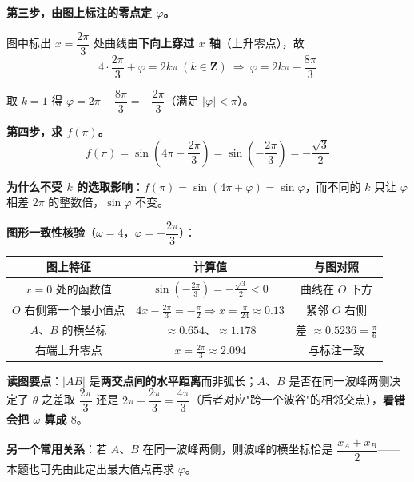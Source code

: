 \textbf{第三步，由图上标注的零点定 $\varphi$。}

图中标出 $x=\dfrac{2\pi}3$ 处曲线\textbf{由下向上穿过 $x$ 轴}（上升零点），故
\[4\cdot\frac{2\pi}3+\varphi=2k\pi\ (k\in\mathbf Z)\ \Longrightarrow\ \varphi=2k\pi-\frac{8\pi}3\]

取 $k=1$ 得 $\varphi=2\pi-\dfrac{8\pi}3=-\dfrac{2\pi}3$（满足 $|\varphi|<\pi$）。

\textbf{第四步，求 $f(\pi)$。}
\[f(\pi)=\sin\left(4\pi-\frac{2\pi}3\right)=\sin\left(-\frac{2\pi}3\right)=-\frac{\sqrt3}2\]

\textbf{为什么不受 $k$ 的选取影响}：$f(\pi)=\sin(4\pi+\varphi)=\sin\varphi$，而不同的 $k$ 只让 $\varphi$ 相差 $2\pi$ 的整数倍，$\sin\varphi$ 不变。

\textbf{图形一致性核验}（$\omega=4$，$\varphi=-\dfrac{2\pi}3$）：

\begin{center}
\begin{tabular}{ccc}
\toprule
图上特征 & 计算值 & 与图对照 \\
\midrule
$x=0$ 处的函数值 & $\sin\left(-\frac{2\pi}3\right)=-\frac{\sqrt3}2<0$ & 曲线在 $O$ 下方  \\
$O$ 右侧第一个最小值点 & $4x-\frac{2\pi}3=-\frac\pi2\Rightarrow x=\frac\pi{24}\approx0.13$ & 紧邻 $O$ 右侧  \\
$A$、$B$ 的横坐标 & $\approx0.654$、$\approx1.178$ & 差 $\approx0.5236=\frac\pi6$  \\
右端上升零点 & $x=\frac{2\pi}3\approx2.094$ & 与标注一致  \\
\bottomrule
\end{tabular}
\end{center}


\begin{gktip}
\textbf{读图要点}：$|AB|$ 是\textbf{两交点间的水平距离}而非弧长；$A$、$B$ 是否在同一波峰两侧决定了 $\theta$ 之差取 $\dfrac{2\pi}3$ 还是 $2\pi-\dfrac{2\pi}3=\dfrac{4\pi}3$（后者对应"跨一个波谷"的相邻交点），\textbf{看错会把 $\omega$ 算成 $8$}。

\textbf{另一个常用关系}：若 $A$、$B$ 在同一波峰两侧，则波峰的横坐标恰是 $\dfrac{x_A+x_B}2$——本题也可先由此定出最大值点再求 $\varphi$。
\end{gktip}

\par\medskip



